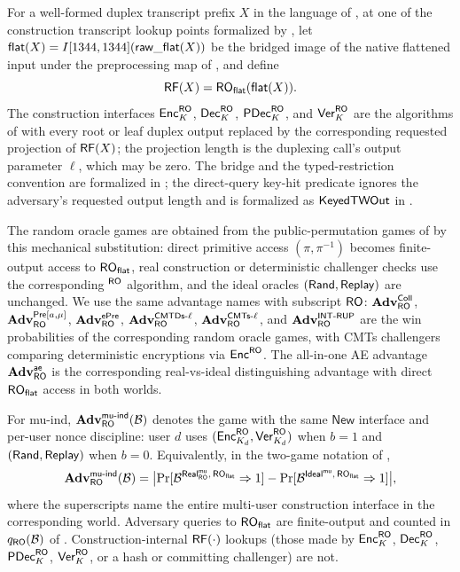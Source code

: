For a well-formed \TW{} duplex transcript prefix $X$ in the language of
, at one of the construction transcript lookup
points formalized by , let
$\mathsf{flat}(X) = I[1344, 1344](\mathsf{raw\_flat}(X))$ be the
bridged image of the native flattened input under the
\cite[Theorem~3]{BDPV11} preprocessing map of , and define
\[
  \mathsf{RF}(X) = \mathsf{RO}_{\mathsf{flat}}(\mathsf{flat}(X)).
\]
The construction interfaces $\mathsf{Enc}_K^{\mathsf{RO}}$, $\mathsf{Dec}_K^{\mathsf{RO}}$,
$\mathsf{PDec}_K^{\mathsf{RO}}$, and $\mathsf{Ver}_K^{\mathsf{RO}}$ are the \TW{} algorithms of
 with every root or leaf duplex output replaced by the
corresponding requested projection of $\mathsf{RF}(X)$; the projection length is the
duplexing call's output parameter $\ell$, which may be zero. The bridge and the
typed-restriction convention are formalized in
; the direct-query key-hit predicate ignores
the adversary's requested output length and is formalized as
$\mathsf{KeyedTWOut}$ in .

The random oracle games are obtained from the public-permutation games of
 by this mechanical
substitution: direct primitive access $(\pi, \pi^{-1})$ becomes finite-output
access to $\mathsf{RO}_{\mathsf{flat}}$, real construction or deterministic challenger checks use
the corresponding ${}^{\mathsf{RO}}$ algorithm, and the ideal oracles $(\mathsf{Rand},\mathsf{Replay})$
are unchanged.
We use the same advantage names with subscript $\mathsf{RO}$: $\mathbf{Adv}^{\mathsf{Coll}}_{\mathsf{RO}}$,
$\mathbf{Adv}^{\mathsf{Pre}[a,\mu]}_{\mathsf{RO}}$, $\mathbf{Adv}^{\mathsf{ePre}}_{\mathsf{RO}}$,
$\mathbf{Adv}^{\mathsf{CMTDs}\text{-}\ell}_{\mathsf{RO}}$, $\mathbf{Adv}^{\mathsf{CMTs}\text{-}\ell}_{\mathsf{RO}}$, and
$\mathbf{Adv}^{\mathsf{INT\text{-}RUP}}_{\mathsf{RO}}$ are the win probabilities of the corresponding random
oracle games, with CMTs challengers comparing deterministic encryptions via
$\mathsf{Enc}^{\mathsf{RO}}$. The all-in-one AE advantage $\mathbf{Adv}^{\mathsf{ae}}_{\mathsf{RO}}$ is the
corresponding real-vs-ideal distinguishing advantage with direct $\mathsf{RO}_{\mathsf{flat}}$
access in both worlds.

For mu-ind, $\mathbf{Adv}^{\mathsf{mu\text{-}ind}}_{\mathsf{RO}}(\mathcal{B})$ denotes the
 game with the same $\mathsf{New}$ interface and per-user
nonce discipline: user $d$ uses
$(\mathsf{Enc}_{K_d}^{\mathsf{RO}}, \mathsf{Ver}_{K_d}^{\mathsf{RO}})$ when $b = 1$ and $(\mathsf{Rand},\mathsf{Replay})$ when
$b = 0$. Equivalently, in the two-game notation of ,
\[
  \mathbf{Adv}^{\mathsf{mu\text{-}ind}}_{\mathsf{RO}}(\mathcal{B}) =
  \bigl|
    \Pr[\mathcal{B}^{\mathsf{Real}^{\mathsf{mu}}_{\mathsf{RO}},\, \mathsf{RO}_{\mathsf{flat}}} \Rightarrow 1]
    - \Pr[\mathcal{B}^{\mathsf{Ideal}^{\mathsf{mu}},\, \mathsf{RO}_{\mathsf{flat}}} \Rightarrow 1]
  \bigr|,
\]
where the superscripts name the entire multi-user construction
interface in the corresponding world.
Adversary queries to $\mathsf{RO}_{\mathsf{flat}}$ are finite-output and counted in
$q_{\mathsf{RO}}(\mathcal{B})$ of . Construction-internal
$\mathsf{RF}(\cdot)$ lookups (those made by $\mathsf{Enc}_K^{\mathsf{RO}}$, $\mathsf{Dec}_K^{\mathsf{RO}}$,
$\mathsf{PDec}_K^{\mathsf{RO}}$, $\mathsf{Ver}_K^{\mathsf{RO}}$, or a hash or committing challenger) are not.

